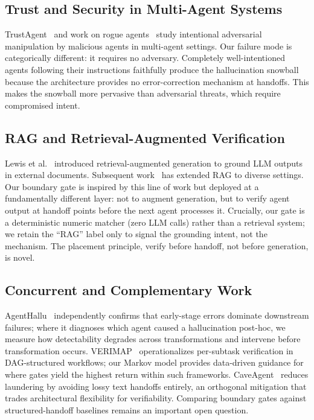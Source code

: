 \documentclass{article}
\theoremstyle{plain}
\theoremstyle{definition}
\theoremstyle{remark}
\begin{document}
\subsection{Trust and Security in Multi-Agent Systems}
TrustAgent~\cite{hua2024trustagent} and work on rogue agents~\cite{yang2024watch} study intentional adversarial manipulation by malicious agents in multi-agent settings. Our failure mode is categorically different: it requires no adversary. Completely well-intentioned agents following their instructions faithfully produce the hallucination snowball because the architecture provides no error-correction mechanism at handoffs. This makes the snowball more pervasive than adversarial threats, which require compromised intent.

\subsection{RAG and Retrieval-Augmented Verification}
Lewis et al.~\cite{lewis2020rag} introduced retrieval-augmented generation to ground LLM outputs in external documents. Subsequent work~\cite{gao2023retrieval} has extended RAG to diverse settings. Our boundary gate is inspired by this line of work but deployed at a fundamentally different layer: not to augment generation, but to verify agent output at handoff points before the next agent processes it. Crucially, our gate is a deterministic numeric matcher (zero LLM calls) rather than a retrieval system; we retain the ``RAG'' label only to signal the grounding intent, not the mechanism. The placement principle, verify before handoff, not before generation, is novel.

\subsection{Concurrent and Complementary Work}
AgentHallu~\cite{agenthallu} independently confirms that early-stage errors dominate downstream failures; where it diagnoses which agent caused a hallucination post-hoc, we measure how detectability degrades across transformations and intervene before transformation occurs. VERIMAP~\cite{verimap} operationalizes per-subtask verification in DAG-structured workflows; our Markov model provides data-driven guidance for where gates yield the highest return within such frameworks. CaveAgent~\cite{caveagent} reduces laundering by avoiding lossy text handoffs entirely, an orthogonal mitigation that trades architectural flexibility for verifiability. Comparing boundary gates against structured-handoff baselines remains an important open question.
\end{document}
